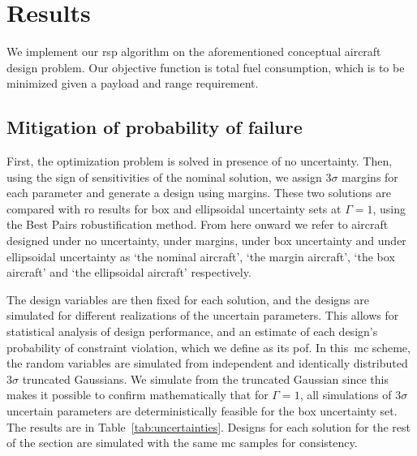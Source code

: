 \section{Results}

We implement our \gls{rsp} algorithm on the aforementioned conceptual aircraft design problem.
Our objective function is total fuel consumption, which is
to be minimized given a payload and range requirement.

\subsection{Mitigation of probability of failure}

First, the optimization problem is solved in presence of no uncertainty. Then, using the sign of
sensitivities of the nominal solution, we assign $3\sigma$ margins for each parameter
and generate a design using margins. These two solutions are compared with \gls{ro} results for
box and ellipsoidal uncertainty sets at $\Gamma = 1$, using the Best Pairs robustification method.
From here onward we refer to
aircraft designed under no uncertainty, under margins, under box uncertainty and
under ellipsoidal uncertainty as `the nominal aircraft',
`the margin aircraft', `the box aircraft' and `the ellipsoidal aircraft' respectively.

The design variables are then fixed for each solution, and the designs are simulated for
different realizations of the uncertain parameters.
This allows for statistical analysis of design performance, and
an estimate of each design's probability of constraint
violation, which we define as its \gls{pof}.
In this~\gls{mc} scheme, the random variables
are simulated from independent and identically distributed $3\sigma$ truncated Gaussians.
We simulate from the truncated Gaussian since this makes it possible to
confirm mathematically that for $\Gamma = 1$, all simulations of $3\sigma$ uncertain parameters are
deterministically feasible for the box uncertainty set. The results are in Table~\ref{tab:uncertainties}.
Designs for each solution for the rest of the section
are simulated with the same \gls{mc} samples for consistency.

